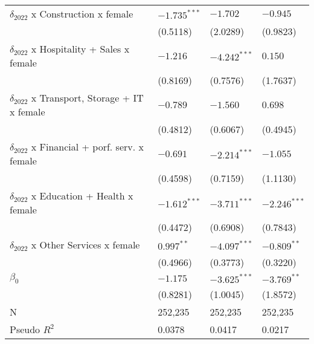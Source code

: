 \begin{tabular}{llll}
$\delta_{2022}$ x Construction x female            &     $-1.735^{***}$ &           $-1.702$ &           $-0.945$ \\
                                                   &           (0.5118) &           (2.0289) &           (0.9823) \\
$\delta_{2022}$ x Hospitality + Sales x female     &           $-1.216$ &     $-4.242^{***}$ &            $0.150$ \\
                                                   &           (0.8169) &           (0.7576) &           (1.7637) \\
$\delta_{2022}$ x Transport, Storage + IT x female &           $-0.789$ &           $-1.560$ &            $0.698$ \\
                                                   &           (0.4812) &           (0.6067) &           (0.4945) \\
$\delta_{2022}$ x Financial + porf. serv. x female &           $-0.691$ &     $-2.214^{***}$ &           $-1.055$ \\
                                                   &           (0.4598) &           (0.7159) &           (1.1130) \\
$\delta_{2022}$ x Education + Health x female      &     $-1.612^{***}$ &     $-3.711^{***}$ &     $-2.246^{***}$ \\
                                                   &           (0.4472) &           (0.6908) &           (0.7843) \\
$\delta_{2022}$ x Other Services x female          &       $0.997^{**}$ &     $-4.097^{***}$ &      $-0.809^{**}$ \\
                                                   &           (0.4966) &           (0.3773) &           (0.3220) \\
$\beta_0$                                          &           $-1.175$ &     $-3.625^{***}$ &      $-3.769^{**}$ \\
                                                   &           (0.8281) &           (1.0045) &           (1.8572) \\
N                                                  &            252,235 &            252,235 &            252,235 \\
Pseudo $R^2$                                       &             0.0378 &             0.0417 &             0.0217 \\
\bottomrule
\end{tabular}
